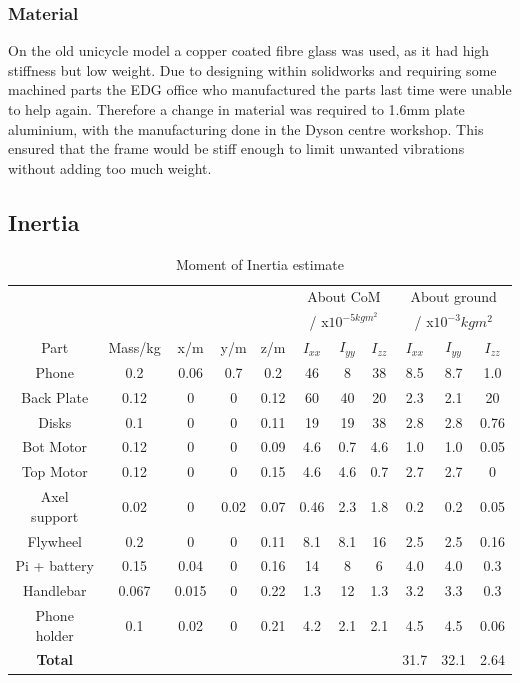 \documentclass[twoside,twocolumn,12pt]{article}
\begin{document}
\subsubsection{Material}
On the old unicycle model a copper coated fibre glass was used, as it had high stiffness but low weight. Due to designing within solidworks and requiring some machined parts the EDG office who manufactured the parts last time were unable to help again. Therefore a change in material was required to 1.6mm plate aluminium, with the manufacturing done in the Dyson centre workshop. This ensured that the frame would be stiff enough to limit unwanted vibrations without adding too much weight. 
\subsection{Inertia}
\begin{table}[ht!]
\centering
\begin{tabular}{ c | c | c | c | c | c | c | c | c | c | c }
&  & &  &  & \multicolumn{3}{c|}{About CoM} & \multicolumn{3}{c}{About ground}\\
&  & &  &  & \multicolumn{3}{c|}{/ x$10^{-5kgm^2}$} & \multicolumn{3}{c}{/ x$10^{-3}kgm^2$}\\
Part& Mass/kg & x/m & y/m & z/m & $I_{xx}$ & $I_{yy}$  & $I_{zz}$ & $I_{xx}$ & $I_{yy}$  & $I_{zz}$ \\ 
\midrule
Phone & 0.2 & 0.06 & 0.7 & 0.2 & 46 & 8 & 38 & 8.5 & 8.7 & 1.0\\
Back Plate & 0.12 & 0 & 0 & 0.12 & 60 & 40 & 20 & 2.3 & 2.1 & 20\\
Disks & 0.1 & 0 & 0 & 0.11 & 19 & 19 & 38 & 2.8 & 2.8 & 0.76\\
Bot Motor & 0.12 & 0 & 0 & 0.09 & 4.6 & 0.7 & 4.6 & 1.0 & 1.0 & 0.05\\
Top Motor & 0.12 & 0 & 0 & 0.15 & 4.6 & 4.6 & 0.7 & 2.7 & 2.7 & 0\\
Axel support & 0.02 & 0 & 0.02 & 0.07 & 0.46 & 2.3 & 1.8 & 0.2 & 0.2 & 0.05\\
Flywheel & 0.2 & 0 & 0 & 0.11 & 8.1 & 8.1 & 16 & 2.5 & 2.5 & 0.16\\
Pi + battery & 0.15 & 0.04& 0 & 0.16 & 14 & 8 & 6 & 4.0 & 4.0 & 0.3\\
Handlebar & 0.067 & 0.015 & 0 & 0.22 & 1.3 & 12 & 1.3 & 3.2 & 3.3 & 0.3\\
Phone holder & 0.1 & 0.02 & 0 & 0.21 & 4.2 & 2.1 & 2.1 & 4.5 & 4.5 & 0.06\\
\midrule
\textbf{Total}
 &  & &  & 
 &  &  &  & 31.7 & 32.1 & 2.64\\
\end{tabular}
\caption{Moment of Inertia estimate}
\label{tab:mot}
\end{table}
\end{document}

